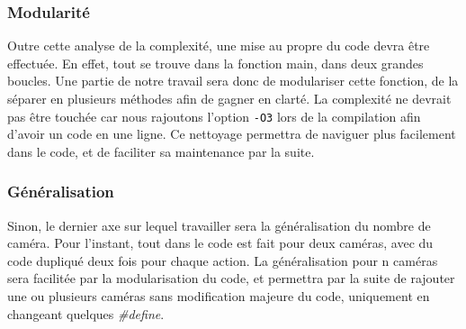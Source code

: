 \subsubsection{Modularité}

Outre cette analyse de la complexité, une mise au propre du code devra être effectuée. En effet, tout se trouve dans la fonction main, dans deux grandes boucles. Une partie de notre travail sera donc de modulariser cette fonction, de la séparer en plusieurs méthodes afin de gagner en clarté. La complexité ne devrait pas être touchée car nous rajoutons l'option \texttt{-O3} lors de la compilation afin d'avoir un code en une ligne. Ce nettoyage permettra de naviguer plus facilement dans le code, et de faciliter sa maintenance par la suite.

\subsubsection{Généralisation}

Sinon, le dernier axe sur lequel travailler sera la généralisation du nombre de caméra. Pour l'instant, tout dans le code est fait pour deux caméras, avec du code dupliqué deux fois pour chaque action. La généralisation pour n caméras sera facilitée par la modularisation du code, et permettra par la suite de rajouter une ou plusieurs caméras sans modification majeure du code, uniquement en changeant quelques \emph{\#define}.
